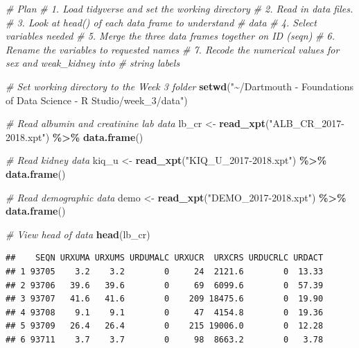 \documentclass[
]{article}
\newenvironment{Shaded}{\begin{snugshade}}{\end{snugshade}}
\newcommand{\CommentTok}[1]{\textcolor[rgb]{0.56,0.35,0.01}{\textit{#1}}}
\newcommand{\FunctionTok}[1]{\textcolor[rgb]{0.13,0.29,0.53}{\textbf{#1}}}
\newcommand{\NormalTok}[1]{#1}
\newcommand{\OtherTok}[1]{\textcolor[rgb]{0.56,0.35,0.01}{#1}}
\newcommand{\SpecialCharTok}[1]{\textcolor[rgb]{0.81,0.36,0.00}{\textbf{#1}}}
\newcommand{\StringTok}[1]{\textcolor[rgb]{0.31,0.60,0.02}{#1}}
\begin{document}
\begin{Shaded}
\begin{Highlighting}[]
\CommentTok{\# Plan}
\CommentTok{\# 1. Load tidyverse and set the working directory}
\CommentTok{\# 2. Read in data files.}
\CommentTok{\# 3. Look at head() of each data frame to understand}
\CommentTok{\#    data}
\CommentTok{\# 4. Select variables needed}
\CommentTok{\# 5. Merge the three data frames together on ID (seqn)}
\CommentTok{\# 6. Rename the variables to requested names}
\CommentTok{\# 7. Recode the numerical values for sex and weak\_kidney into}
\CommentTok{\#    string labels}


\CommentTok{\# Set working directory to the Week 3 folder}
\FunctionTok{setwd}\NormalTok{(}\StringTok{"\textasciitilde{}/Dartmouth {-} Foundations of Data Science {-} R Studio/week\_3/data"}\NormalTok{)}


\CommentTok{\# Read albumin and creatinine lab data}
\NormalTok{lb\_cr }\OtherTok{\textless{}{-}} \FunctionTok{read\_xpt}\NormalTok{(}\StringTok{"ALB\_CR\_2017{-}2018.xpt"}\NormalTok{) }\SpecialCharTok{\%\textgreater{}\%}
  \FunctionTok{data.frame}\NormalTok{()}

\CommentTok{\# Read kidney data}
\NormalTok{kiq\_u }\OtherTok{\textless{}{-}} \FunctionTok{read\_xpt}\NormalTok{(}\StringTok{"KIQ\_U\_2017{-}2018.xpt"}\NormalTok{) }\SpecialCharTok{\%\textgreater{}\%}
  \FunctionTok{data.frame}\NormalTok{()}

\CommentTok{\# Read demographic data}
\NormalTok{demo }\OtherTok{\textless{}{-}} \FunctionTok{read\_xpt}\NormalTok{(}\StringTok{"DEMO\_2017{-}2018.xpt"}\NormalTok{) }\SpecialCharTok{\%\textgreater{}\%}
  \FunctionTok{data.frame}\NormalTok{()}


\CommentTok{\# View head of data}
\FunctionTok{head}\NormalTok{(lb\_cr)}
\end{Highlighting}
\end{Shaded}

\begin{verbatim}
##    SEQN URXUMA URXUMS URDUMALC URXUCR  URXCRS URDUCRLC URDACT
## 1 93705    3.2    3.2        0     24  2121.6        0  13.33
## 2 93706   39.6   39.6        0     69  6099.6        0  57.39
## 3 93707   41.6   41.6        0    209 18475.6        0  19.90
## 4 93708    9.1    9.1        0     47  4154.8        0  19.36
## 5 93709   26.4   26.4        0    215 19006.0        0  12.28
## 6 93711    3.7    3.7        0     98  8663.2        0   3.78
\end{verbatim}
\end{document}
